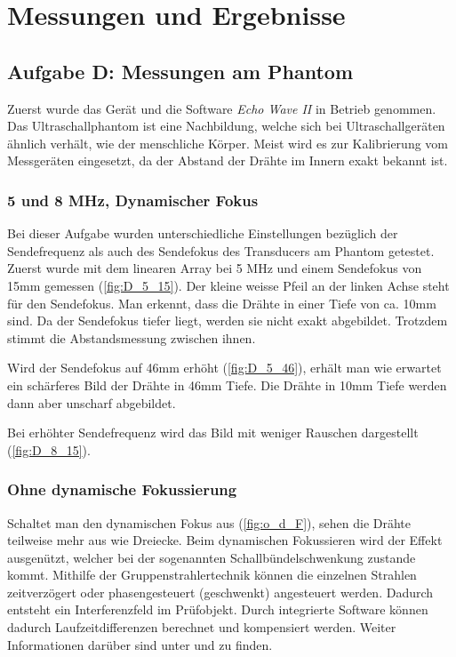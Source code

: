 \documentclass[11pt]{scrartcl}
\begin{document}
    \section{Messungen und Ergebnisse}

    \subsection{Aufgabe D: Messungen am Phantom}
    Zuerst wurde das Gerät und die Software \emph{Echo Wave II} in Betrieb genommen.
    Das Ultraschallphantom ist eine Nachbildung, welche sich bei Ultraschallgeräten ähnlich verhält, wie der
    menschliche Körper.
    Meist wird es zur Kalibrierung vom Messgeräten eingesetzt, da der Abstand der Drähte im Innern exakt bekannt ist.

    \subsubsection{5 und 8 MHz, Dynamischer Fokus}

    Bei dieser Aufgabe wurden unterschiedliche Einstellungen bezüglich der Sendefrequenz als auch des Sendefokus des Transducers am Phantom getestet.
    Zuerst wurde mit dem linearen Array bei 5 MHz und einem Sendefokus von 15mm gemessen (\autoref{fig:D_5_15}).
    Der kleine weisse Pfeil an der linken Achse steht für den Sendefokus.
    Man erkennt, dass die Drähte in einer Tiefe von ca. 10mm sind.
    Da der Sendefokus tiefer liegt, werden sie nicht exakt abgebildet.
    Trotzdem stimmt die Abstandsmessung zwischen ihnen.

    Wird der Sendefokus auf 46mm erhöht (\autoref{fig:D_5_46}), erhält man wie erwartet ein schärferes Bild der
    Drähte in 46mm Tiefe.
    Die Drähte in 10mm Tiefe werden dann aber unscharf abgebildet.

    Bei erhöhter Sendefrequenz wird das Bild mit weniger Rauschen dargestellt (\autoref{fig:D_8_15}).

    \subsubsection{Ohne dynamische Fokussierung}

    Schaltet man den dynamischen Fokus aus (\autoref{fig:o_d_F}), sehen die Drähte teilweise mehr aus wie
    Dreiecke.
    Beim dynamischen Fokussieren wird der Effekt ausgenützt, welcher bei der sogenannten Schallbündelschwenkung zustande
    kommt.
    Mithilfe der Gruppenstrahlertechnik können die einzelnen Strahlen zeitverzögert oder phasengesteuert (geschwenkt)
    angesteuert werden.
    Dadurch entsteht ein Interferenzfeld im Prüfobjekt.
    Durch integrierte Software können dadurch Laufzeitdifferenzen berechnet und kompensiert werden.
    Weiter Informationen darüber sind unter \cite{gruppenstrahler} und \cite{arraytechnik} zu finden.
\end{document}
